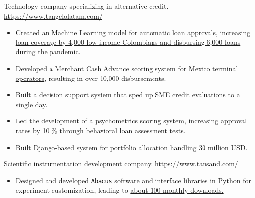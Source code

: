 \documentclass[11pt, letterpaper, sans]{moderncv}
\begin{document}
    {
        Technology company specializing in alternative credit. \url{https://www.tangelolatam.com/}
        \vspace{3pt}
        \begin{itemize}
            \item Created an Machine Learning model for automatic loan approvals, \href{https://forbes.co/2020/05/13/emprendedores/zinobe-obtiene-us30-millones-en-financiacion-para-otorgar-mas-creditos-digitales}{\color{color1} increasing loan coverage by 4,000 low-income Colombians and disbursing 6,000 loans during the pandemic.}
            \item Developed a \href{https://tekiosmag.com/2022/03/31/fintech-tangelo-anuncia-alianza-con-el-unicornio-mexicano-clip-y-dell-leasing/}{\color{color1} Merchant Cash Advance scoring system for Mexico terminal operators}, resulting in over 10,000 disbursements.
            \item Built a decision support system that sped up SME credit evaluations to a single day.
            \item Led the development of a \href{https://psychometrics.zinobe.com/v1/}{\color{color1}psychometrics scoring system}, increasing approval rates by 10 \% through behavioral loan assessment tests.
            \item Built {\color{color3} Django}-based system for \href{https://contxto.com/es/fondeo/fintech-zinobe-levanta-inversion-monachil-capital-partners/}{\color{color1} portfolio allocation handling 30 million USD.}
        \end{itemize}
    }

    {
        Scientific instrumentation development company. \url{https://www.tausand.com/}
        \vspace{3pt}
        \begin{itemize}
            \item Designed and developed \href{https://www.tausand.com/downloads/}{\color{color1} \texttt{Abacus}} software and interface libraries in {\color{color3} Python} for experiment customization, leading to \href{https://pypistats.org/packages/pyabacus}{\color{color1} about 100 monthly downloads.}
        \end{itemize}
    }
\end{document}
